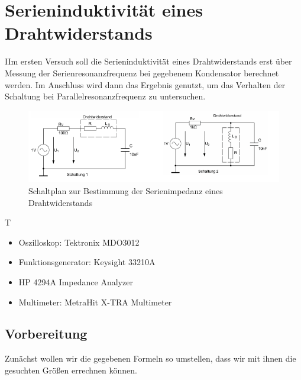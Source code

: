 \documentclass{article}
\begin{document}
\tableofcontents


\newpage

\section{Serieninduktivität eines Drahtwiderstands}
\begin{task}
  IIm ersten Versuch soll die Serieninduktivität eines Drahtwiderstands erst über Messung der Serienresonanzfrequenz bei
  gegebenem Kondensator berechnet werden. Im Anschluss wird dann das Ergebnis genutzt, um das Verhalten der Schaltung bei Parallelresonanzfrequenz zu untersuchen.
\end{task}
\begin{figure}[h]
  \begin{center}
    \includegraphics[scale=0.8]{assets/images/Versuch1Schaltplan.PNG}
    \caption{Schaltplan zur Bestimmung der Serienimpedanz eines Drahtwiderstands}
  \end{center}
\end{figure}
\begin{devlist}
  T
  \begin{itemize}
    \item Oszilloskop: Tektronix MDO3012
    \item Funktionsgenerator: Keysight 33210A
    \item HP 4294A Impedance Analyzer
    \item Multimeter: MetraHit X-TRA Multimeter
  \end{itemize}
\end{devlist}
\subsection{Vorbereitung}
\begin{figure}

\end{figure}
Zunächst wollen wir die gegebenen Formeln so umstellen, dass wir mit ihnen die gesuchten Größen errechnen können.
\end{document}
